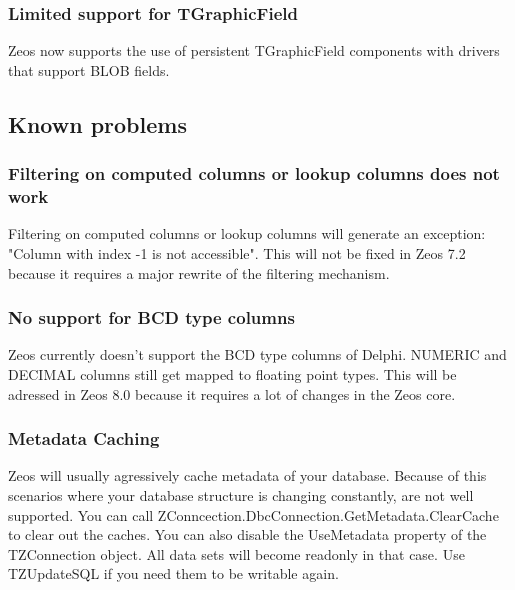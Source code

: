 \documentclass[a4paper,12pt,oneside]{book}
\begin{document}
\subsubsection{Limited support for TGraphicField}
\label{sec:Rev6_General_Changes_TGrapgicField}

Zeos now supports the use of persistent TGraphicField components with drivers that support BLOB fields.

\subsection{Known problems}
\label{sec:Rev6_General_KnownProblems}

\subsubsection{Filtering on computed columns or lookup columns does not work}
\label{sec:Rev6_General_KnownProblems_FilteringComputeColumnsLookupColumns}

Filtering on computed columns or lookup columns will generate an exception: "Column with index -1 is not accessible".
This will not be fixed in Zeos 7.2 because it requires a major rewrite of the filtering mechanism.

\subsubsection{No support for BCD type columns}
\label{sec:Rev6_General_KnownProblems_BCD}

Zeos currently doesn't support the BCD type columns of Delphi.
NUMERIC and DECIMAL columns still get mapped to floating point types.
This will be adressed in Zeos 8.0 because it requires a lot of changes in the Zeos core.

\subsubsection{Metadata Caching}
\label{sec:Rev6_General_KnownProblems_MetadataCaching}

Zeos will usually agressively cache metadata of your database.
Because of this scenarios where your database structure is changing constantly, are not well supported.
You can call ZConncection.\-DbcConnection.\-GetMetadata.\-ClearCache to clear out the caches.
You can also disable the UseMetadata property of the TZConnection object.
All data sets will become readonly in that case.
Use TZUpdateSQL if you need them to be writable again.
\end{document}
